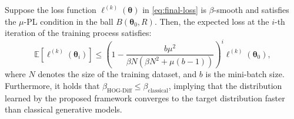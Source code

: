 Suppose the loss function $\ell^{(k)}(\bm{\theta})$ in \cref{eq:final-loss} is $\beta$-smooth and satisfies the $\mu$-PL condition in the ball $B\left(\boldsymbol{\theta}_0, R\right)$. 
Then, the expected loss at the $i$-th iteration of the training process satisfies:
\begin{equation}
\mathbb{E}\left[\ell^{(k)}(\bm{\theta}_i)\right] 
\leq \left(1-\frac{b\mu^2}{\beta N(\beta N^2+\mu(b-1))}\right)^i \ell^{(k)}\left(\bm{\theta}_0\right),\nonumber
\end{equation}
where $N$ denotes the size of the training dataset, and $b$ is the mini-batch size.
Furthermore, it holds that $\beta_{\text{HOG-Diff}}\leq \beta_{\text{classical}}$, implying that the distribution learned by the proposed framework converges to the target distribution faster than classical generative models.